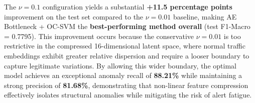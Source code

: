     \begin{table}[H]
        \centering
        \begin{minipage}{0.48\linewidth}
            \centering
            \vspace{0.5em}
            \caption{AE Bottleneck + OC-SVM: impact of $\nu$ on performance.}
            \label{tab:bottleneck_nu}
        \end{minipage}\hfill
        \begin{minipage}{0.48\linewidth}
            \centering
            \vspace{0.5em}
            \caption{Performance metrics for the optimal AE Bottleneck + OC-SVM configuration ($\nu=0.1$).}
            \label{tab:bottleneck_perf}
        \end{minipage}
    \end{table}

    \vspace{-0.2cm}

    \noindent
    The $\nu = 0.1$ configuration yields a substantial \textbf{+11.5 percentage points} improvement on the test set compared to the $\nu=0.01$ baseline, making AE Bottleneck + OC-SVM the \textbf{best-performing method overall} (test F1-Macro = 0.7795).
    This improvement occurs because the conservative $\nu = 0.01$ is too restrictive in the compressed 16-dimensional latent space, where normal traffic embeddings exhibit greater relative dispersion and require a looser boundary to capture legitimate variations.
    By allowing this wider boundary, the optimal model achieves an exceptional anomaly recall of \textbf{88.21\%} while maintaining a strong precision of \textbf{81.68\%}, demonstrating that non-linear feature compression effectively isolates structural anomalies while mitigating the risk of alert fatigue.

